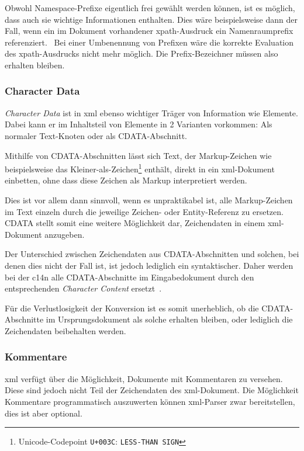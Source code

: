 Obwohl Namespace\hyp{}Prefixe eigentlich frei gewählt werden können, ist es möglich, dass auch sie wichtige Informationen enthalten. Dies wäre beispielsweise dann der Fall, wenn ein im Dokument vorhandener \acrshort{xpath}\hyp{}Ausdruck ein Namenraumprefix referenziert.~\cite[Abschn. 4.4]{boyer2001c14n} Bei einer Umbenennung von Prefixen wäre die korrekte Evaluation des \acrshort{xpath}\hyp{}Ausdrucks nicht mehr möglich. Die Prefix-Bezeichner müssen also erhalten bleiben.

\subsubsection{Character Data}
\label{sec:cdata}

\emph{Character Data} ist in \acrshort{xml} ebenso wichtiger Träger von Information wie Elemente. Dabei kann er im Inhaltsteil von Elemente in 2 Varianten vorkommen: Als normaler Text-Knoten oder als CDATA-Abschnitt.

Mithilfe von CDATA-Abschnitten lässt sich Text, der Markup-Zeichen wie beispielsweise das Kleiner-als-Zeichen\footnote{Unicode-Codepoint \texttt{U+003C}: \texttt{LESS-THAN SIGN}} enthält, direkt in ein \acrshort{xml}-Dokument einbetten, ohne dass diese Zeichen als Markup interpretiert werden.

Dies ist vor allem dann sinnvoll, wenn es unpraktikabel ist, alle Markup-Zeichen im Text einzeln durch die jeweilige Zeichen- oder Entity-Referenz zu ersetzen. CDATA stellt somit eine weitere Möglichkeit dar, Zeichendaten in einem \acrshort{xml}-Dokument anzugeben.~\cite[Abschnitt~2.4]{maler2008xml}

Der Unterschied zwischen Zeichendaten aus CDATA-Abschnitten und solchen, bei denen dies nicht der Fall ist, ist jedoch lediglich ein syntaktischer. Daher werden bei der \acrlong{c14n} alle CDATA-Abschnitte im Eingabedokument durch den entsprechenden \emph{Character Content} ersetzt~\cite[Abschnitt~2.1]{boyer2001c14n}.

Für die Verlustlosigkeit der Konversion ist es somit unerheblich, ob die CDATA-Abschnitte im Ursprungsdokument als solche erhalten bleiben, oder lediglich die Zeichendaten beibehalten werden.

\subsubsection{Kommentare}

\acrshort{xml} verfügt über die Möglichkeit, Dokumente mit Kommentaren zu versehen. Diese sind jedoch nicht Teil der Zeichendaten des \acrshort{xml}-Dokument. Die Möglichkeit Kommentare programmatisch auszuwerten können  \acrshort{xml}-Parser zwar bereitstellen, dies ist aber optional.

